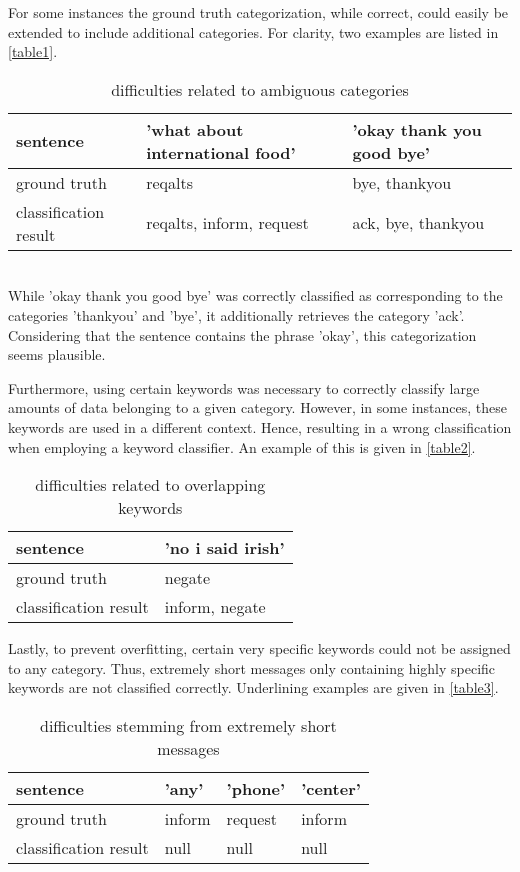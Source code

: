 \documentclass[a4paper]{article}
\begin{document}
For some instances the ground truth categorization, while correct, could easily be extended to include additional categories. For clarity, two examples are listed in \autoref{table1}.
\begin{table}[h!]
    \centering
    \begin{tabular}{l|l|l}
     sentence & 'what about international food' & 'okay thank you good bye' \\ \hline
     ground truth & reqalts & bye, thankyou \\ \hline
     classification result & reqalts, inform, request & ack, bye, thankyou
    \end{tabular}
    \caption{difficulties related to ambiguous categories}
    \label{table1}
\end{table}{} \\
While 'okay thank you good bye' was correctly classified as corresponding to the categories 'thankyou' and 'bye', it additionally retrieves the category 'ack'. Considering that the sentence contains the phrase 'okay', this categorization seems plausible.

Furthermore, using certain keywords was necessary to correctly classify large amounts of data belonging to a given category. However, in some instances, these keywords are used in a different context. Hence, resulting in a wrong classification when employing a keyword classifier. An example of this is given in \autoref{table2}.\\
\begin{table}[h!]
    \centering
    \begin{tabular}{l|l}
     sentence & 'no i said irish' \\ \hline
     ground truth & negate  \\ \hline
     classification result & inform, negate
    \end{tabular}
    \caption{difficulties related to overlapping keywords}
    \label{table2}
\end{table}{}

Lastly, to prevent overfitting, certain very specific keywords could not be assigned to any category. Thus, extremely short messages only containing highly specific keywords are not classified correctly. Underlining examples are given in \autoref{table3}.
\begin{table}[h!]
    \centering
    \begin{tabular}{l|l|l|l}
     sentence & 'any' & 'phone' & 'center'\\ \hline
     ground truth & inform & request & inform\\ \hline
     classification result & null & null & null
    \end{tabular}
    \caption{difficulties stemming from extremely short messages}
    \label{table3}
\end{table}{}
\end{document}
